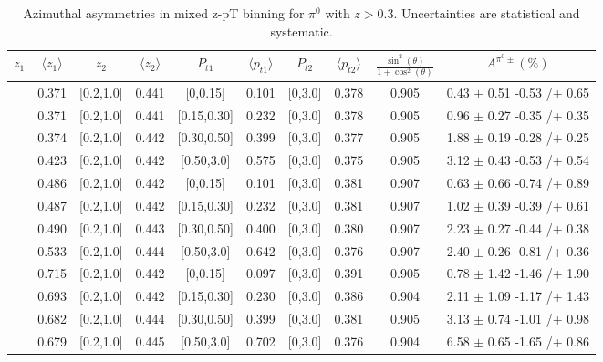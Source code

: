\begin{table}[H]\scriptsize
\centering
\begin{tabular}{|c| c| c| c| c| c| c| c| c| c|}
\hline
$z_1$& $\langle  z_{1}  \rangle$ & $z_2$ & $\langle  z_{2}\rangle$& $P_{t1}$ & $\langle  p_{t1} \rangle$& $P_{t2}$ &  $\langle p_{t2}\rangle$ &$\frac{\sin^2(\theta)}{1+\cos^2(\theta)}$& $A^{\pi^0\pm}(\%)$   \\ \hline
[0.3,0.5]	&	0.371	&	[0.2,1.0]	&	0.441	&	[0,0.15]	&	0.101	&	[0,3.0]	&	0.378	&	0.905	&	0.43	$\pm$ 	0.51	-0.53	/+	0.65	\\ \hline
[0.3,0.5]	&	0.371	&	[0.2,1.0]	&	0.441	&	[0.15,0.30]	&	0.232	&	[0,3.0]	&	0.378	&	0.905	&	0.96	$\pm$ 	0.27	-0.35	/+	0.35	\\ \hline
[0.3,0.5]	&	0.374	&	[0.2,1.0]	&	0.442	&	[0.30,0.50]	&	0.399	&	[0,3.0]	&	0.377	&	0.905	&	1.88	$\pm$ 	0.19	-0.28	/+	0.25	\\ \hline
[0.3,0.5]	&	0.423	&	[0.2,1.0]	&	0.442	&	[0.50,3.0]	&	0.575	&	[0,3.0]	&	0.375	&	0.905	&	3.12	$\pm$ 	0.43	-0.53	/+	0.54	\\ \hline
[0.5,0.7]	&	0.486	&	[0.2,1.0]	&	0.442	&	[0,0.15]	&	0.101	&	[0,3.0]	&	0.381	&	0.907	&	0.63	$\pm$ 	0.66	-0.74	/+	0.89	\\ \hline
[0.5,0.7]	&	0.487	&	[0.2,1.0]	&	0.442	&	[0.15,0.30]	&	0.232	&	[0,3.0]	&	0.381	&	0.907	&	1.02	$\pm$ 	0.39	-0.39	/+	0.61	\\ \hline
[0.5,0.7]	&	0.490	&	[0.2,1.0]	&	0.443	&	[0.30,0.50]	&	0.400	&	[0,3.0]	&	0.380	&	0.907	&	2.23	$\pm$ 	0.27	-0.44	/+	0.38	\\ \hline
[0.5,0.7]	&	0.533	&	[0.2,1.0]	&	0.444	&	[0.50,3.0]	&	0.642	&	[0,3.0]	&	0.376	&	0.907	&	2.40	$\pm$ 	0.26	-0.81	/+	0.36	\\ \hline
[0.7,1.0]	&	0.715	&	[0.2,1.0]	&	0.442	&	[0,0.15]	&	0.097	&	[0,3.0]	&	0.391	&	0.905	&	0.78	$\pm$ 	1.42	-1.46	/+	1.90	\\ \hline
[0.7,1.0]	&	0.693	&	[0.2,1.0]	&	0.442	&	[0.15,0.30]	&	0.230	&	[0,3.0]	&	0.386	&	0.904	&	2.11	$\pm$ 	1.09	-1.17	/+	1.43	\\ \hline
[0.7,1.0]	&	0.682	&	[0.2,1.0]	&	0.444	&	[0.30,0.50]	&	0.399	&	[0,3.0]	&	0.381	&	0.905	&	3.13	$\pm$ 	0.74	-1.01	/+	0.98	\\ \hline
[0.7,1.0]	&	0.679	&	[0.2,1.0]	&	0.445	&	[0.50,3.0]	&	0.702	&	[0,3.0]	&	0.376	&	0.904	&	6.58	$\pm$ 	0.65	-1.65	/+	0.86	\\ \hline
\end{tabular}
\caption{Azimuthal asymmetries in mixed z-pT binning for $\pi^0$ with $z>0.3$. Uncertainties are statistical and systematic.}
\label{tab:finaletaptbins}
\end{table}


